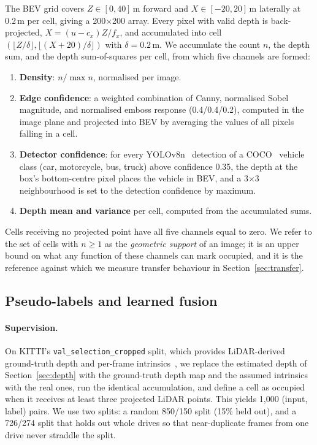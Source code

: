 \documentclass[sigconf]{acmart}
\newcommand{\rev}[1]{{\color{revcolor}#1}}
\begin{document}
The BEV grid covers $Z \in [0, 40]$\,m forward and $X \in [-20, 20]$\,m laterally at 0.2\,m per cell, giving a 200$\times$200 array. Every pixel with valid depth is back-projected, $X = (u - c_x)Z/f_x$, and accumulated into cell $(\lfloor Z/\delta\rfloor, \lfloor (X+20)/\delta \rfloor)$ with $\delta = 0.2$\,m. We accumulate the count $n$, the depth sum, and the depth sum-of-squares per cell, from which five channels are formed:
\begin{enumerate}
\item \textbf{Density}: $n/\max n$, normalised per image.
\item \textbf{Edge confidence}: a weighted combination of Canny, normalised Sobel magnitude, and normalised emboss response (0.4/0.4/0.2), computed in the image plane and projected into BEV by averaging the values of all pixels falling in a cell.
\item \textbf{Detector confidence}: for every YOLOv8n~\cite{jocher2023yolov8} detection of a COCO~\cite{lin2014coco} vehicle class (car, motorcycle, bus, truck) above confidence 0.35, the depth at the box's bottom-centre pixel places the vehicle in BEV, and a 3$\times$3 neighbourhood is set to the detection confidence by maximum.
\item[4--5.] \textbf{Depth mean and variance} per cell, computed from the accumulated sums.
\end{enumerate}
Cells receiving no projected point have all five channels equal to zero. We refer to the set of cells with $n \geq 1$ as the \emph{geometric support} of an image; it is an upper bound on what any function of these channels can mark occupied, and it is the reference against which we measure transfer behaviour in Section~\ref{sec:transfer}.

\subsection{Pseudo-labels and learned fusion}\label{sec:fusion}

\paragraph{Supervision.} On KITTI's \texttt{val\_\allowbreak selection\_\allowbreak cropped} split, which provides LiDAR-derived ground-truth depth and per-frame intrinsics~\cite{uhrig2017sparsity}, we replace the estimated depth of Section~\ref{sec:depth} with the ground-truth depth map and the assumed intrinsics with the real ones, run the identical accumulation, and define a cell as occupied when it receives at least three projected LiDAR points. This yields \rev{1{,}000 (input, label) pairs. We use two splits: a random 850/150 split (15\% held out), and a 726/274 split that holds out whole drives so that near-duplicate frames from one drive never straddle the split.}
\end{document}
